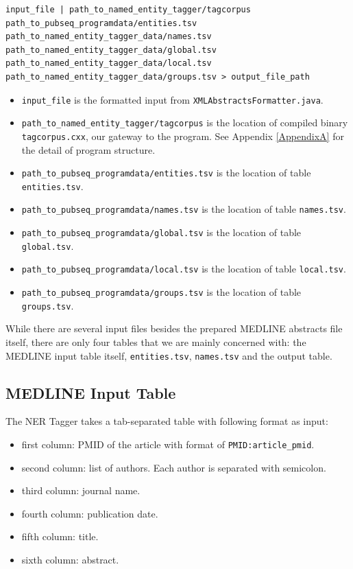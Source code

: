 \begin{lstlisting}[breaklines]
input_file | path_to_named_entity_tagger/tagcorpus path_to_pubseq_programdata/entities.tsv path_to_named_entity_tagger_data/names.tsv path_to_named_entity_tagger_data/global.tsv path_to_named_entity_tagger_data/local.tsv path_to_named_entity_tagger_data/groups.tsv > output_file_path
\end{lstlisting}

\begin{itemize}
\item \texttt{input\_file} is the formatted input from \texttt{XMLAbstractsFormatter.java}.
\item \texttt{path\_to\_named\_entity\_tagger/tagcorpus} is the location of compiled binary \texttt{tagcorpus.cxx}, our gateway to the program. See Appendix \ref{AppendixA} for the detail of program structure.
\item \texttt{path\_to\_pubseq\_programdata/entities.tsv} is the location of table \texttt{entities.tsv}.
\item \texttt{path\_to\_pubseq\_programdata/names.tsv} is the location of table \texttt{names.tsv}.
\item \texttt{path\_to\_pubseq\_programdata/global.tsv} is the location of table \texttt{global.tsv}.
\item \texttt{path\_to\_pubseq\_programdata/local.tsv} is the location of table \texttt{local.tsv}.
\item \texttt{path\_to\_pubseq\_programdata/groups.tsv} is the location of table \texttt{groups.tsv}.
\end{itemize}

While there are several input files besides the prepared MEDLINE abstracts file itself, there are only four tables that we are mainly concerned with: the MEDLINE input table itself, \texttt{entities.tsv}, \texttt{names.tsv} and the output table.

\subsection{MEDLINE Input Table}

The NER Tagger takes a tab-separated table with following format as input:

\begin{itemize}
\item first column: PMID of the article with format of \texttt{PMID:article\_pmid}.
\item second column: list of authors. Each author is separated with semicolon.
\item third column: journal name.
\item fourth column: publication date.
\item fifth column: title.
\item sixth column: abstract.
\end{itemize}

